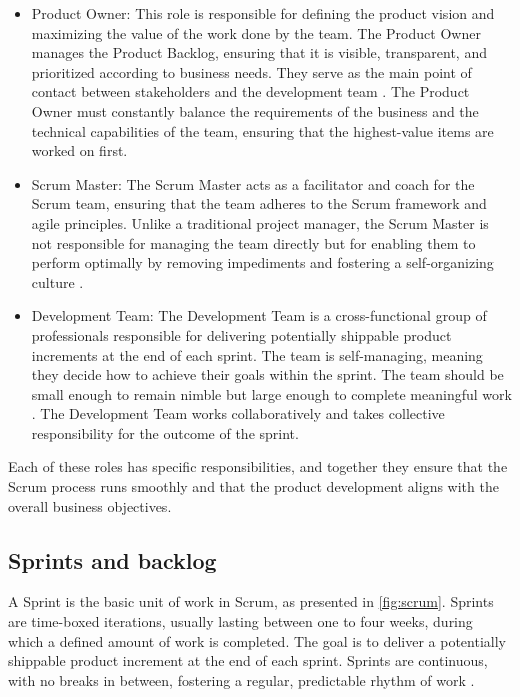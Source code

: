\begin{itemize}
  \item Product Owner: This role is responsible for defining the product vision and
    maximizing the value of the work done by the team. The Product Owner manages the
    Product Backlog, ensuring that it is visible, transparent, and prioritized according
    to business needs. They serve as the main point of contact between stakeholders and
    the development team \parencite{openagile2019roles}. The Product Owner must constantly
    balance the requirements of the business and the technical capabilities of the team,
    ensuring that the highest-value items are worked on first.
  \item Scrum Master: The Scrum Master acts as a facilitator and coach for the Scrum team,
    ensuring that the team adheres to the Scrum framework and agile principles. Unlike a
    traditional project manager, the Scrum Master is not responsible for managing the team
    directly but for enabling them to perform optimally by removing impediments and
    fostering a self-organizing culture \parencite{cobb2015scrum}.
  \item Development Team: The Development Team is a cross-functional group of professionals
    responsible for delivering potentially shippable product increments at the end of each
    sprint. The team is self-managing, meaning they decide how to achieve their goals
    within the sprint. The team should be small enough to remain nimble but large enough
    to complete meaningful work \parencite{rubin2012sprints}. The Development Team works
    collaboratively and takes collective responsibility for the outcome of the sprint.
\end{itemize}

Each of these roles has specific responsibilities, and together they ensure that the Scrum
process runs smoothly and that the product development aligns with the overall business
objectives.

\subsection{Sprints and backlog}

A Sprint is the basic unit of work in Scrum, as presented in \cref{fig:scrum}. Sprints
are time-boxed iterations, usually lasting between one to four weeks, during which a
defined amount of work is completed. The goal is to deliver a potentially shippable
product increment at the end of each sprint. Sprints are continuous, with no breaks in
between, fostering a regular, predictable rhythm of work \parencite{cobb2015scrum}.


